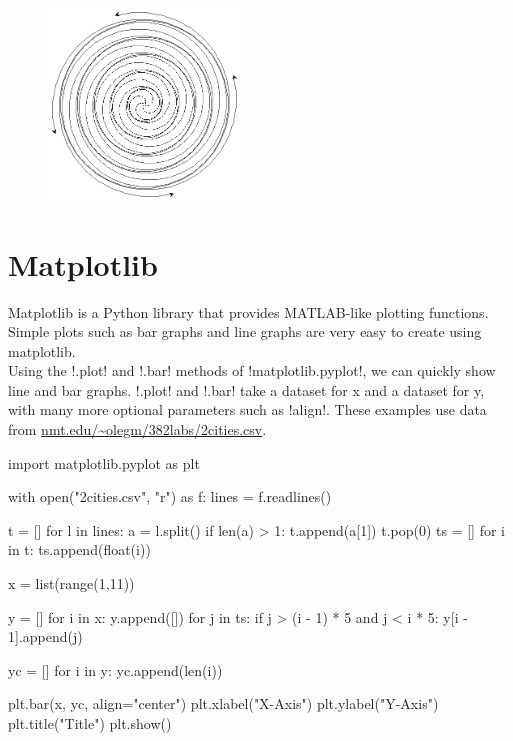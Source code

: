 \documentclass[11pt]{cselabheader}
\begin{document}
\begin{figure}[h]
  \centering
  \includegraphics[width=2.0in]{img/fancy_spiral}
\end{figure}

\section{Matplotlib}
Matplotlib is a Python library that provides MATLAB-like plotting functions.  Simple plots such as bar graphs and line graphs are very easy to create using matplotlib.\\
Using the \pythoninline!.plot! and \pythoninline!.bar! methods of \pythoninline!matplotlib.pyplot!, we can quickly show line and bar graphs. \pythoninline!.plot! and \pythoninline!.bar! take a dataset for x and a dataset for y, with many more optional parameters such as \pythoninline!align!.  These examples use data from \url{nmt.edu/~olegm/382labs/2cities.csv}.

\begin{python3code}
import matplotlib.pyplot as plt

with open("2cities.csv", "r") as f:
        lines = f.readlines()

t = []
for l in lines:
        a = l.split()
        if len(a) > 1:
                t.append(a[1])
t.pop(0)
ts = []
for i in t:
        ts.append(float(i))

x = list(range(1,11))

y = []
for i in x:
        y.append([])
        for j in ts:
                if j > (i - 1) * 5 and j < i * 5:
                        y[i - 1].append(j)

yc = []
for i in y:
        yc.append(len(i))

plt.bar(x, yc, align="center")
plt.xlabel("X-Axis")
plt.ylabel("Y-Axis")
plt.title("Title")
plt.show()
\end{python3code}
\end{document}
